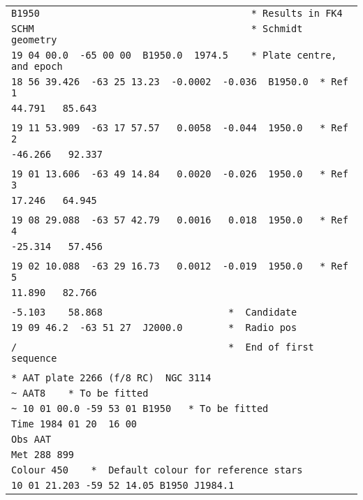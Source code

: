 \documentclass[twoside,11pt]{article}
\renewcommand{\_}{\texttt{\symbol{95}}}
\begin{document}
\newpage
\begin{center}
\begin{scriptsize}
\begin{tabular}{|l|}
\hline
\verb|B1950                                     * Results in FK4| \\
\verb|SCHM                                      * Schmidt geometry| \\
\verb|19 04 00.0  -65 00 00  B1950.0  1974.5    * Plate centre, and epoch| \\
\verb|18 56 39.426  -63 25 13.23  -0.0002  -0.036  B1950.0  * Ref 1| \\
\verb|44.791   85.643| \\
\\
\verb|19 11 53.909  -63 17 57.57   0.0058  -0.044  1950.0   * Ref 2| \\
\verb|-46.266   92.337| \\
\\
\verb|19 01 13.606  -63 49 14.84   0.0020  -0.026  1950.0   * Ref 3| \\
\verb|17.246   64.945| \\
\\
\verb|19 08 29.088  -63 57 42.79   0.0016   0.018  1950.0   * Ref 4| \\
\verb|-25.314   57.456| \\
\\
\verb|19 02 10.088  -63 29 16.73   0.0012  -0.019  1950.0   * Ref 5| \\
\verb|11.890   82.766| \\
\\
\verb|-5.103    58.868                      *  Candidate| \\
\verb|19 09 46.2  -63 51 27  J2000.0        *  Radio pos| \\
\\
\verb|/                                     *  End of first sequence| \\
\\
\verb|* AAT plate 2266 (f/8 RC)  NGC 3114| \\
\verb|~ AAT8    * To be fitted| \\
\verb|~ 10 01 00.0 -59 53 01 B1950   * To be fitted| \\
\verb|Time 1984 01 20  16 00| \\
\verb|Obs AAT| \\
\verb|Met 288 899| \\
\verb|Colour 450    *  Default colour for reference stars| \\
\verb|10 01 21.203 -59 52 14.05 B1950 J1984.1| \\

\end{tabular}
\end{scriptsize}
\end{center}
\end{document}
